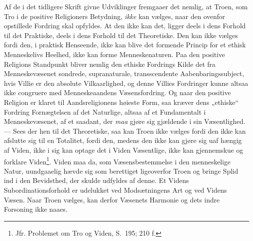 Af de i det tidligere Skrift givne Udviklinger fremgaaer det nemlig, at Troen,
som Tro i de positive Religioners Betydning, \emph{ikke} kan vælges, naar den
ovenfor opstillede Fordring skal opfyldes. At den ikke kan det, ligger deels i
dens Forhold til det Praktiske, deels i dens Forhold til det Theoretiske. Den
kan ikke vælges fordi den, i praktisk Henseende, ikke kan blive det formende
Princip for et ethisk Menneskelivs Heelhed, ikke kan forme Menneskenaturen.
Paa den positive Religions Standpunkt bliver nemlig den ethiske Fordrings
Kilde det fra Menneskevæsenet sondrede, supranaturale, transscendente
Aabenbaringssubject, hvis Villie er den absolute Vilkaarlighed, og denne
Villies Fordringer kunne altsaa ikke congruere med Menneskeaandens
Væsensfordring. Og naar den positive Religion er klaret til Aandsreligionens
høieste Form, saa kræver dens „ethiske“ Fordring Fornægtelsen af det
Naturlige, altsaa af et Fundamentalt i Menneskevæsenet, af et saadant, der
\emph{maa} gjøre sig gjældende i sin Væsentlighed. --- Sees der hen til det
Theoretiske, saa kan Troen ikke vælges fordi den ikke kan afslutte sig til en
Totalitet, fordi den, medens den ikke kan gjøre sig uaf\-%
\setcounter{footnote}{0}%
hængig af Viden, ikke i sig kan optage det i Viden Væsentlige, ikke kan
gjennemskue og forklare Viden\footnote{Jfr. Problemet om Tro og Viden, S.\ 195;
210 f.}.
Viden maa da, som Væsensbestemmelse i den menneskelige Natur, uundgaaelig
hævde sig som berettiget ligeoverfor Troen og bringe Splid ind i den
Bevidsthed, der skulde udfyldes af denne. Et Videns Subordinationsforhold er
udelukket ved Modsætningens Art og ved Videns Væsen. Naar Troen vælges, kan
derfor Væsenets Harmonie og dets indre Forsoning ikke naaes.

